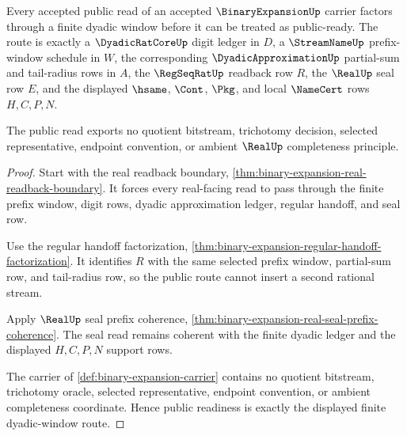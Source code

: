 \begin{theorem}
\label{thm:binary-expansion-dyadic-window-public-readiness}
Every accepted public read of an accepted $\BinaryExpansionUp$ carrier factors through a finite dyadic window before it can be treated as public-ready. The route is exactly a $\DyadicRatCoreUp$ digit ledger in $D$, a $\StreamNameUp$ prefix-window schedule in $W$, the corresponding $\DyadicApproximationUp$ partial-sum and tail-radius rows in $A$, the $\RegSeqRatUp$ readback row $R$, the $\RealUp$ seal row $E$, and the displayed $\hsame$, $\Cont$, $\Pkg$, and local $\NameCert$ rows $H,C,P,N$.

The public read exports no quotient bitstream, trichotomy decision, selected representative, endpoint convention, or ambient $\RealUp$ completeness principle.
\end{theorem}
\begin{proof}
Start with the real readback boundary, \autoref{thm:binary-expansion-real-readback-boundary}. It forces every real-facing read to pass through the finite prefix window, digit rows, dyadic approximation ledger, regular handoff, and seal row.

Use the regular handoff factorization, \autoref{thm:binary-expansion-regular-handoff-factorization}. It identifies $R$ with the same selected prefix window, partial-sum row, and tail-radius row, so the public route cannot insert a second rational stream.

Apply $\RealUp$ seal prefix coherence, \autoref{thm:binary-expansion-real-seal-prefix-coherence}. The seal read remains coherent with the finite dyadic ledger and the displayed $H,C,P,N$ support rows.

The carrier of \autoref{def:binary-expansion-carrier} contains no quotient bitstream, trichotomy oracle, selected representative, endpoint convention, or ambient completeness coordinate. Hence public readiness is exactly the displayed finite dyadic-window route.
\end{proof}

